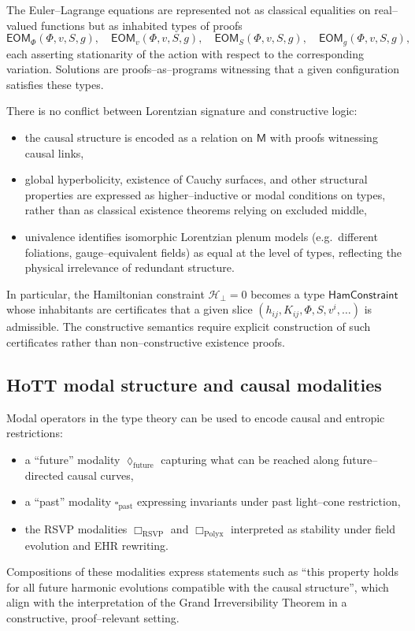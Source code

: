 The Euler–Lagrange equations are represented not as classical equalities on real–valued functions but as inhabited types of proofs
\[
\mathsf{EOM}_\Phi(\Phi,v,S,g),\quad
\mathsf{EOM}_v(\Phi,v,S,g),\quad
\mathsf{EOM}_S(\Phi,v,S,g),\quad
\mathsf{EOM}_g(\Phi,v,S,g),
\]
each asserting stationarity of the action with respect to the corresponding variation. Solutions are proofs–as–programs witnessing that a given configuration satisfies these types.

There is no conflict between Lorentzian signature and constructive logic:
\begin{itemize}
  \item the causal structure is encoded as a relation on $\mathsf{M}$ with proofs witnessing causal links,
  \item global hyperbolicity, existence of Cauchy surfaces, and other structural properties are expressed as higher–inductive or modal conditions on types, rather than as classical existence theorems relying on excluded middle,
  \item univalence identifies isomorphic Lorentzian plenum models (e.g.\ different foliations, gauge–equivalent fields) as equal at the level of types, reflecting the physical irrelevance of redundant structure.
\end{itemize}

In particular, the Hamiltonian constraint $\mathcal{H}_\perp=0$ becomes a type $\mathsf{HamConstraint}$ whose inhabitants are certificates that a given slice $(h_{ij},K_{ij},\Phi,S,v^i,\ldots)$ is admissible. The constructive semantics require explicit construction of such certificates rather than non–constructive existence proofs.

\subsection{HoTT modal structure and causal modalities}

Modal operators in the type theory can be used to encode causal and entropic restrictions:
\begin{itemize}
  \item a ``future'' modality $\lozenge_{\mathrm{future}}$ capturing what can be reached along future–directed causal curves,
  \item a ``past'' modality $\square_{\mathrm{past}}$ expressing invariants under past light–cone restriction,
  \item the RSVP modalities $\Box_{\mathrm{RSVP}}$ and $\Box_{\mathrm{Polyx}}$ interpreted as stability under field evolution and EHR rewriting.
\end{itemize}
Compositions of these modalities express statements such as ``this property holds for all future harmonic evolutions compatible with the causal structure'', which align with the interpretation of the Grand Irreversibility Theorem in a constructive, proof–relevant setting.

